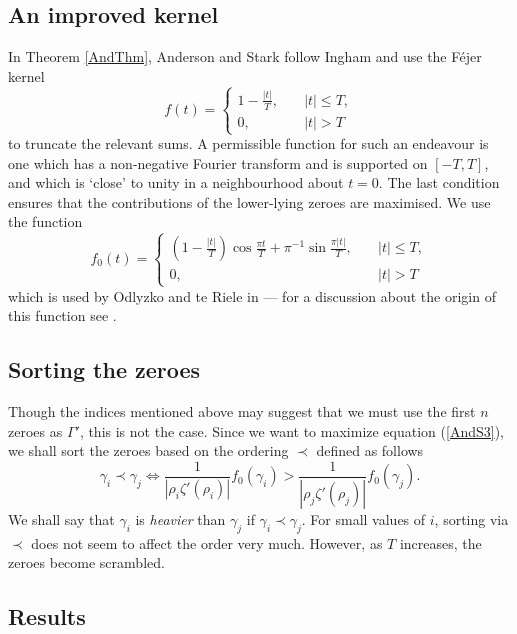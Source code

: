 \documentclass{article}
\numberwithin{equation}{section}
\begin{document}
\subsection{An improved kernel}
In Theorem \ref{AndThm}, Anderson and Stark follow Ingham and use the F\'{e}jer kernel
\begin{equation*}
f(t) = \begin{cases} 1 - \frac{|t|}{T}, &\quad |t|\leq T, \\
0, &\quad |t| >T \end{cases}
\end{equation*}
to truncate the relevant sums. A permissible function for such an endeavour is one which has a non-negative Fourier transform and is supported on $[-T, T]$, and which is `close'  to unity in a neighbourhood about $t=0$. The last condition ensures that the contributions of the lower-lying zeroes are maximised. We use the function
\begin{equation*}
f_0(t) = \begin{cases} (1- \frac{|t|}{T})\cos \frac{\pi t}{T} + \pi^{-1}\sin\frac{\pi |t|}{T}, &\quad |t| \leq T, \\
0, &\quad |t|>T
\end{cases}
\end{equation*}
which is used by Odlyzko and te Riele in \cite{MertDis} --- for a discussion about the origin of this function see \cite[\S 4.1]{MertDis}.

\subsection{Sorting the zeroes}

Though the indices mentioned above may suggest that we must use the first $n$ zeroes as $\Gamma'$, this is not the case. Since we want to maximize equation (\ref{AndS3}), we shall sort the zeroes based on the ordering $\prec$ defined as follows
\begin{equation}\label{heavy-order}\gamma_i \prec \gamma_j \iff \frac{1}{|\rho_{i} \zeta'(\rho_{i})|} f_0\left(\gamma_{i}\right) > \frac{1}{|\rho_{j} \zeta'(\rho_{j})|} f_0\left(\gamma_{j}\right).\end{equation} We shall say that $\gamma_i$ is {\it heavier} than $\gamma_j$ if $\gamma_i \prec \gamma_j$.
For small values of $i$, sorting via $\prec$ does not seem to affect the order very much. However, as $T$ increases, the zeroes become scrambled.

\subsection{Results}
\end{document}

